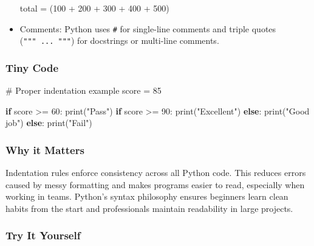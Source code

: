 \documentclass[
  letterpaper,
  DIV=11,
  numbers=noendperiod]{scrreprt}
\newenvironment{Shaded}{\begin{snugshade}}{\end{snugshade}}
\newcommand{\BuiltInTok}[1]{\textcolor[rgb]{0.00,0.23,0.31}{#1}}
\newcommand{\CommentTok}[1]{\textcolor[rgb]{0.37,0.37,0.37}{#1}}
\newcommand{\ControlFlowTok}[1]{\textcolor[rgb]{0.00,0.23,0.31}{\textbf{#1}}}
\newcommand{\DecValTok}[1]{\textcolor[rgb]{0.68,0.00,0.00}{#1}}
\newcommand{\NormalTok}[1]{\textcolor[rgb]{0.00,0.23,0.31}{#1}}
\newcommand{\OperatorTok}[1]{\textcolor[rgb]{0.37,0.37,0.37}{#1}}
\newcommand{\StringTok}[1]{\textcolor[rgb]{0.13,0.47,0.30}{#1}}
\begin{document}
\begin{itemize}
\begin{Shaded}
\begin{Highlighting}[]
\NormalTok{total }\OperatorTok{=}\NormalTok{ (}\DecValTok{100} \OperatorTok{+} \DecValTok{200} \OperatorTok{+} \DecValTok{300} \OperatorTok{+}
         \DecValTok{400} \OperatorTok{+} \DecValTok{500}\NormalTok{)}
\end{Highlighting}
\end{Shaded}
\item
  Comments: Python uses \texttt{\#} for single-line comments and triple
  quotes (\texttt{"""\ ...\ """}) for docstrings or multi-line comments.
\end{itemize}

\subsubsection{Tiny Code}\label{tiny-code-2}

\begin{Shaded}
\begin{Highlighting}[]
\CommentTok{\# Proper indentation example}
\NormalTok{score }\OperatorTok{=} \DecValTok{85}

\ControlFlowTok{if}\NormalTok{ score }\OperatorTok{\textgreater{}=} \DecValTok{60}\NormalTok{:}
    \BuiltInTok{print}\NormalTok{(}\StringTok{"Pass"}\NormalTok{)}
    \ControlFlowTok{if}\NormalTok{ score }\OperatorTok{\textgreater{}=} \DecValTok{90}\NormalTok{:}
        \BuiltInTok{print}\NormalTok{(}\StringTok{"Excellent"}\NormalTok{)}
    \ControlFlowTok{else}\NormalTok{:}
        \BuiltInTok{print}\NormalTok{(}\StringTok{"Good job"}\NormalTok{)}
\ControlFlowTok{else}\NormalTok{:}
    \BuiltInTok{print}\NormalTok{(}\StringTok{"Fail"}\NormalTok{)}
\end{Highlighting}
\end{Shaded}

\subsubsection{Why it Matters}\label{why-it-matters-2}

Indentation rules enforce consistency across all Python code. This
reduces errors caused by messy formatting and makes programs easier to
read, especially when working in teams. Python's syntax philosophy
ensures beginners learn clean habits from the start and professionals
maintain readability in large projects.

\subsubsection{Try It Yourself}\label{try-it-yourself-2}
\end{document}
